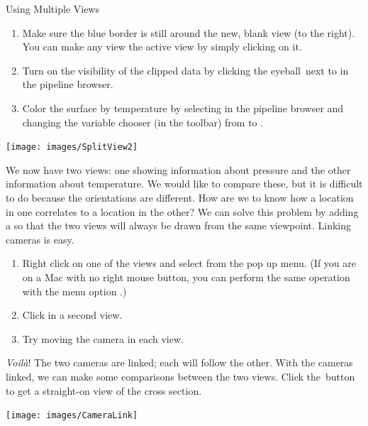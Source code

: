 \begin{exercise}{Using Multiple Views}
  \begin{enumerate}
    \restorecounter
  \item Make sure the blue border is still around the new, blank view (to
    the right).  You can make any view the active view by simply clicking
    on it.
  \item Turn on the visibility of the clipped data by clicking the
    eyeball~\eyeballg next to  in the pipeline browser.
  \item Color the surface by temperature by selecting  in the
    pipeline browser and changing the variable chooser (in the toolbar)
    from  to .
    \savecounter
  \end{enumerate}

  \begin{inlinefig}
    \texttt{[image: images/SplitView2]}
  \end{inlinefig}

  We now have two views: one showing information about pressure and the
  other information about temperature.  We would like to compare these, but
  it is difficult to do because the orientations are different.  How are we
  to know how a location in one correlates to a location in the other?  We
  can solve this problem by adding a  so that the two
  views will always be drawn from the same viewpoint.  Linking cameras is
  easy.

  \begin{enumerate}
    \restorecounter
  \item Right click on one of the views and select 
    from the pop up menu. (If you are on a Mac with no right mouse button,
    you can perform the same operation with the menu option  \ra
    .)
  \item Click in a second view.
  \item Try moving the camera in each view.
  \end{enumerate}

  \emph{Voil\`{a}}!  The two cameras are linked; each will follow the other.
  With the cameras linked, we can make some comparisons between the two
  views.  Click the~\xPlus button to get a straight-on view of the cross
  section.

  \begin{inlinefig}
    \texttt{[image: images/CameraLink]}
  \end{inlinefig}


\end{exercise}
